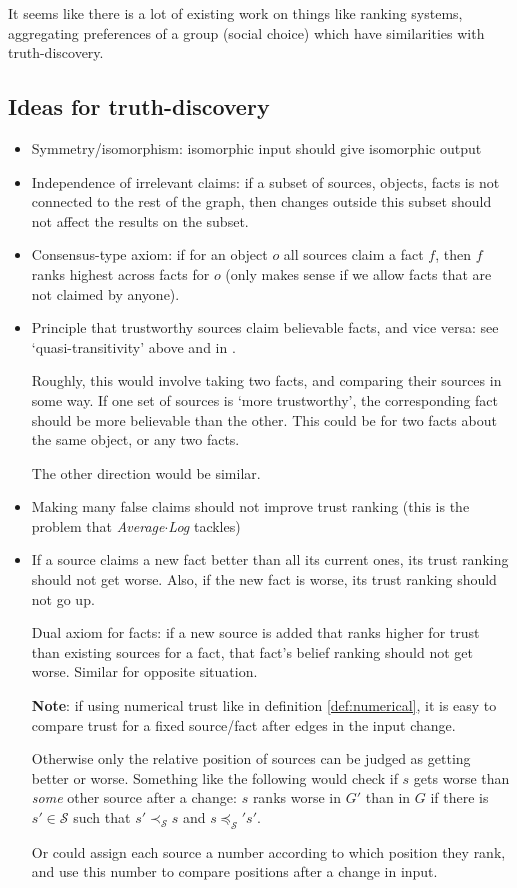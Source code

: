 \documentclass{article}
\theoremstyle{definition}
\theoremstyle{plain}
\begin{document}
It seems like there is a lot of existing work on things like ranking systems,
aggregating preferences of a group (social choice) which have similarities with
truth-discovery.

\subsection{Ideas for truth-discovery}
\begin{itemize}

\item Symmetry/isomorphism: isomorphic input should give isomorphic output

\item Independence of irrelevant claims: if a subset of sources, objects, facts
is not connected to the rest of the graph, then changes outside this subset
should not affect the results on the subset.

\item Consensus-type axiom: if for an object $o$ all sources claim a fact $f$,
then $f$ ranks highest across facts for $o$ (only makes sense if we allow facts
that are not claimed by anyone).

\item Principle that trustworthy sources claim believable facts, and vice
versa: see `quasi-transitivity' above and in \cite{altman_personalised}.

Roughly, this would involve taking two facts, and comparing their sources in
some way. If one set of sources is `more trustworthy', the corresponding fact
should be more believable than the other. This could be for two facts about the
same object, or any two facts.

The other direction would be similar.

\item Making many false claims should not improve trust ranking (this is the
problem that \emph{Average${\cdot}$Log} tackles)

\item If a source claims a new fact better than all its current ones, its trust
ranking should not get worse. Also, if the new fact is worse, its trust ranking
should not go up.

Dual axiom for facts: if a new source is added that ranks higher for trust than
existing sources for a fact, that fact's belief ranking should not get worse.
Similar for opposite situation.

\textbf{Note}: if using numerical trust like in definition \ref{def:numerical},
it is easy to compare trust for a fixed source/fact after edges in the input
change.

Otherwise only the relative position of sources can be judged as getting better
or worse. Something like the following would check if $s$ gets worse than
\emph{some} other source after a change: $s$ ranks worse in $G'$ than in $G$ if
there is $s' \in \mathcal{S}$ such that $s' \prec_{\mathcal{S}} s$ and $s
\preceq_{\mathcal{S}}' s'$.

Or could assign each source a number according to which position they rank, and
use this number to compare positions after a change in input.

\end{itemize}

{}


\end{document}

